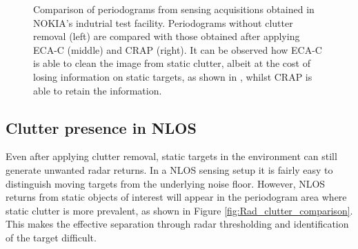 \begin{figure}[H]
{		}\hfill
		\caption[]{\small Comparison of periodograms from sensing acquisitions obtained in NOKIA's indutrial test facility.
		Periodograms without clutter removal (left) are compared with those obtained after applying ECA-C (middle) and CRAP (right). It can be observed how ECA-C is able to clean the image from static clutter, albeit at the cost of losing information on static targets, as shown in , whilst CRAP is able to retain the information.  }
		\label{fig:Rad_clutter_crap-ecac}
	\end{figure}
	
	\subsection{Clutter presence in NLOS}
	
	Even after applying clutter removal, static targets in the environment can still generate unwanted radar returns.
	In a NLOS sensing setup it is fairly easy to distinguish moving targets from the underlying noise floor.
	However, NLOS returns from static objects of interest will appear in the periodogram area where static clutter is more prevalent, as shown in Figure \ref{fig:Rad_clutter_comparison}.
	This makes the effective separation through radar thresholding and identification of the target difficult.


